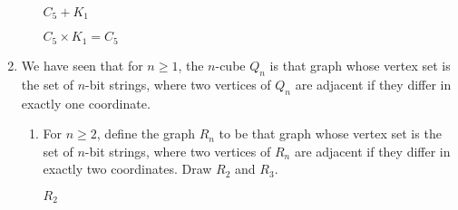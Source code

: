 \documentclass[letterpaper,12pt,fleqn]{article}
\begin{document}
\begin{enumerate}[start=21]
\begin{enumerate}
\begin{minipage}{2.5in}
\begin{center}
        \bigskip

        \(C_5+K_1\)
      \end{center}
    \end{minipage}
    \begin{minipage}{2.5in}
      \begin{center}

        \bigskip

        \(C_5\times K_1=C_5\)
      \end{center}
    \end{minipage}
  \end{enumerate}

  \bigskip

\item We have seen that for \(n\ge1\), the \(n\)-cube \(Q_n\) is that graph whose vertex set is the set of
  \(n\)-bit strings, where two vertices of \(Q_n\) are adjacent if they differ in exactly one coordinate.
  \begin{enumerate}
  \item For \(n\ge2\), define the graph \(R_n\) to be that graph whose vertex set is the set of \(n\)-bit strings,
    where two vertices of \(R_n\) are adjacent if they differ in exactly two coordinates.  Draw \(R_2\) and
    \(R_3\).

    \bigskip

    \begin{minipage}{2.5in}
      \begin{center}

        \bigskip

        \(R_2\)
      \end{center}
    \end{minipage}
    \begin{minipage}{3in}
      \begin{center}


\end{center}
\end{minipage}
\end{enumerate}
\end{enumerate}
\end{document}
